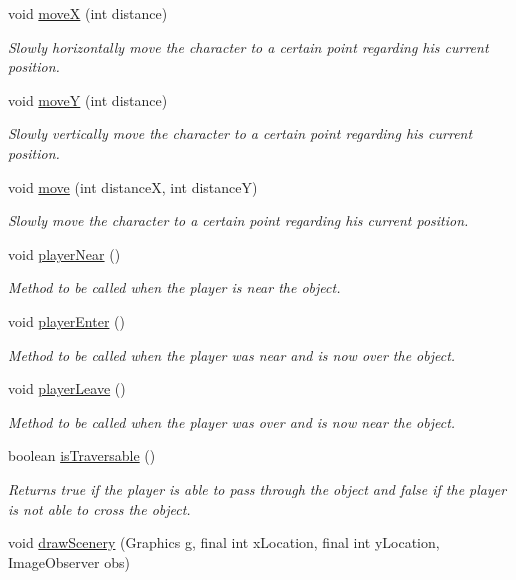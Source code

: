 \begin{DoxyCompactItemize}
void \hyperlink{classworld_1_1character_1_1_character_afd88136a2b4b1ece60657bb4481ab955}{move\-X} (int distance)
\begin{DoxyCompactList}\small\item\em Slowly horizontally move the character to a certain point regarding his current position. \end{DoxyCompactList}\item 
void \hyperlink{classworld_1_1character_1_1_character_af0dd57e9b3d6a43fec1292f5333f0208}{move\-Y} (int distance)
\begin{DoxyCompactList}\small\item\em Slowly vertically move the character to a certain point regarding his current position. \end{DoxyCompactList}\item 
void \hyperlink{classworld_1_1character_1_1_character_a69468dde4db9cb9e4ce0838dc6977c8c}{move} (int distance\-X, int distance\-Y)
\begin{DoxyCompactList}\small\item\em Slowly move the character to a certain point regarding his current position. \end{DoxyCompactList}\item 
void \hyperlink{classworld_1_1character_1_1_character_a367d28c710b44853dd42daf2f35d1de8}{player\-Near} ()
\begin{DoxyCompactList}\small\item\em Method to be called when the player is near the object. \end{DoxyCompactList}\item 
void \hyperlink{classworld_1_1character_1_1_character_a9e727e0924694a8dcb032d6bb61b30d9}{player\-Enter} ()
\begin{DoxyCompactList}\small\item\em Method to be called when the player was near and is now over the object. \end{DoxyCompactList}\item 
void \hyperlink{classworld_1_1character_1_1_character_a94b4af7f2a48ad7288e64be4393ffeb2}{player\-Leave} ()
\begin{DoxyCompactList}\small\item\em Method to be called when the player was over and is now near the object. \end{DoxyCompactList}\item 
boolean \hyperlink{classworld_1_1character_1_1_character_afe899056167497ab0de734cd2f19219a}{is\-Traversable} ()
\begin{DoxyCompactList}\small\item\em Returns true if the player is able to pass through the object and false if the player is not able to cross the object. \end{DoxyCompactList}\item 
void \hyperlink{classworld_1_1scenery_1_1_scenery_a626c1ae7fa15d2f96d564c35368fdbc9}{draw\-Scenery} (Graphics g, final int x\-Location, final int y\-Location, Image\-Observer obs)
\end{DoxyCompactItemize}
